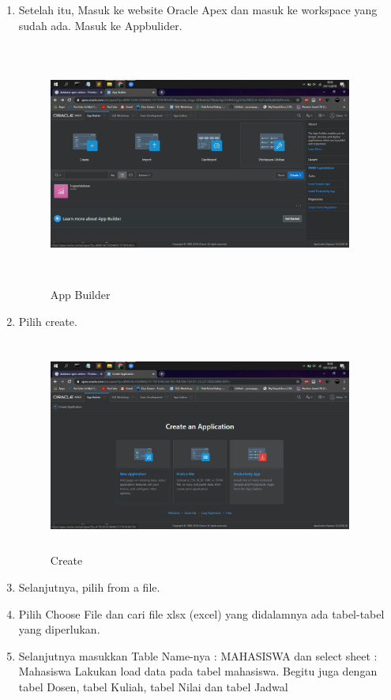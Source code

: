 \begin{enumerate}
\item Setelah itu, Masuk ke website Oracle Apex dan masuk ke workspace yang sudah ada. Masuk ke Appbulider.

\begin{figure}[!htbp]
\centering
\includegraphics[width=10cm,height=8cm]{figures/1.png}
\caption{App Builder}
\label{penanda}
\end{figure}

\item Pilih create.

\begin{figure}[!htbp]
\centering
\includegraphics[width=10cm,height=7cm]{figures/2.png}
\caption{Create}
\label{penanda}
\end{figure}

\item Selanjutnya, pilih from a file.

\item Pilih Choose File dan cari file xlsx (excel) yang didalamnya ada tabel-tabel yang diperlukan.

\item Selanjutnya masukkan Table Name-nya : MAHASISWA dan select sheet : Mahasiswa Lakukan load data pada tabel mahasiswa. Begitu juga dengan tabel Dosen, tabel Kuliah, tabel Nilai dan tabel Jadwal


\end{enumerate}
